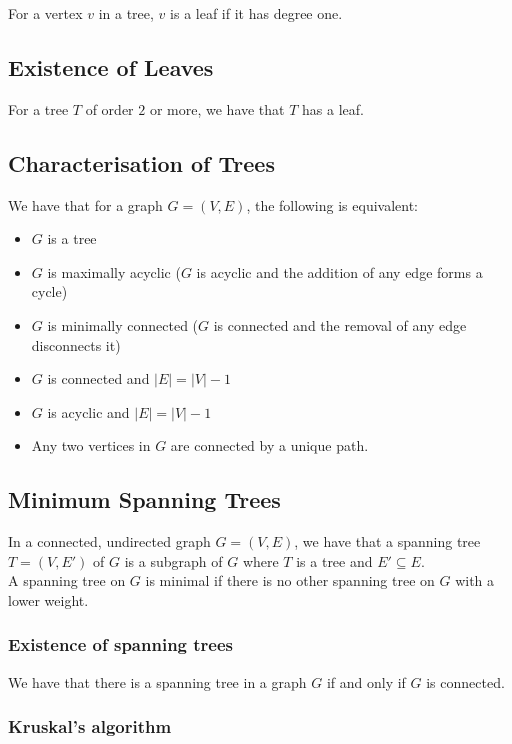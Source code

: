 \documentclass[a4paper, 12pt, twoside]{article}
\begin{document}
For a vertex $v$ in a tree, $v$ is a leaf if it has degree one.

\subsection{Existence of Leaves}

For a tree $T$ of order $2$ or more, we have that $T$ has a leaf.

\subsection{Characterisation of Trees}

We have that for a graph $G = (V, E)$, the following is equivalent:
\begin{itemize}
  \item $G$ is a tree
  \item $G$ is maximally acyclic ($G$ is acyclic and the addition
  of any edge forms a cycle)
  \item $G$ is minimally connected ($G$ is connected and the removal
  of any edge disconnects it)
  \item $G$ is connected and $|E| = |V| - 1$
  \item $G$ is acyclic and $|E| = |V| - 1$
  \item Any two vertices in $G$ are connected by a unique path.
\end{itemize}

\subsection{Minimum Spanning Trees}

In a connected, undirected graph $G = (V, E)$, we have that a
spanning tree $T = (V, E')$ of $G$ is a subgraph of $G$ where
$T$ is a tree and $E' \subseteq E$.
\\[\baselineskip]
A spanning tree on $G$ is minimal if there is no other spanning tree
on $G$ with a lower weight.

\subsubsection{Existence of spanning trees}

We have that there is a spanning tree in a graph $G$ if and only if
$G$ is connected.

\newpage

\subsubsection{Kruskal's algorithm}
\end{document}
